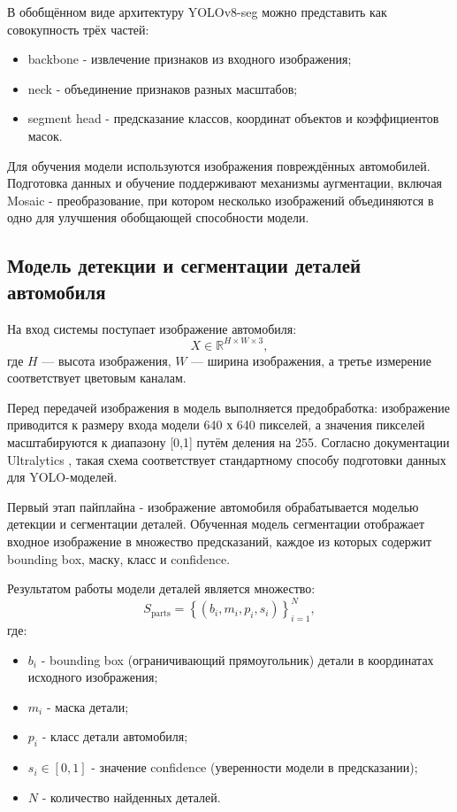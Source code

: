 В обобщённом виде архитектуру YOLOv8-seg можно представить как совокупность трёх частей:
\begin{itemize}
    \item backbone - извлечение признаков из входного изображения;
    \item neck - объединение признаков разных масштабов;
    \item segment head - предсказание классов, координат объектов и коэффициентов масок.
\end{itemize}

Для обучения модели используются изображения повреждённых автомобилей. Подготовка данных и обучение поддерживают механизмы аугментации, включая Mosaic - преобразование, при котором несколько изображений объединяются в одно для улучшения обобщающей способности модели.

\subsection{Модель детекции и сегментации деталей автомобиля}

На вход системы поступает изображение автомобиля:
\[
X \in \mathbb{R}^{H \times W \times 3},
\]
где $H$ --- высота изображения, $W$ --- ширина изображения, а третье измерение соответствует цветовым каналам.

Перед передачей изображения в модель выполняется предобработка: изображение приводится к размеру входа модели 640 х 640 пикселей, а значения пикселей масштабируются к диапазону [0,1] путём деления на 255. Согласно документации Ultralytics \cite{src22}, такая схема соответствует стандартному способу подготовки данных для YOLO-моделей.

Первый этап пайплайна - изображение автомобиля обрабатывается моделью детекции и сегментации деталей. Обученная модель сегментации отображает входное изображение в множество предсказаний, каждое из которых содержит bounding box, маску, класс и confidence.

Результатом работы модели деталей является множество:
\[
S_{\text{parts}} = \left\{(b_i, m_i, p_i, s_i)\right\}_{i=1}^{N},
\]
где:
\begin{itemize}
    \item $b_i$ - bounding box (ограничивающий прямоугольник) детали в координатах исходного изображения;
    \item $m_i$ - маска детали;
    \item $p_i$ - класс детали автомобиля;
    \item $s_i \in [0,1]$ - значение confidence (уверенности модели в предсказании);
    \item $N$ - количество найденных деталей.
\end{itemize}

